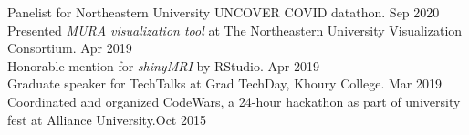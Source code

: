 \documentclass[a4paper]{article}
\newcommand{\mybullet}{
	\indent 
  \textbullet \hspace*{2mm}
}
\begin{document}
    \mybullet Panelist for Northeastern University UNCOVER COVID datathon. \hfill Sep 2020 \\
    \mybullet Presented \textit{MURA visualization tool} at The Northeastern University 
    Visualization Consortium. \hfill Apr 2019 \\
    \mybullet Honorable mention for \textit{shinyMRI} by RStudio. \hfill Apr 2019 \\
    \mybullet Graduate speaker for TechTalks at Grad TechDay, Khoury College. \hfill Mar 2019 \\
		\mybullet Coordinated and organized CodeWars, a 24-hour hackathon as part of 
		university fest at Alliance University.\hfill Oct 2015\\
	
\end{document}
